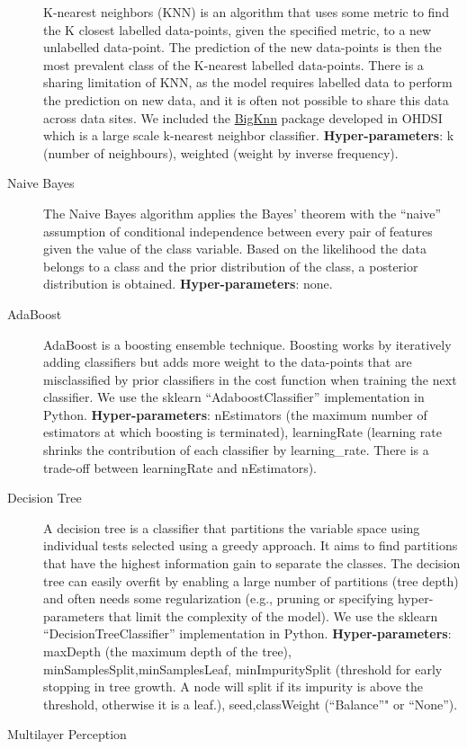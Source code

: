 \documentclass[]{book}
\begin{document}
\begin{description}
K-nearest neighbors (KNN) is an algorithm that uses some metric to find
the K closest labelled data-points, given the specified metric, to a new
unlabelled data-point. The prediction of the new data-points is then the
most prevalent class of the K-nearest labelled data-points. There is a
sharing limitation of KNN, as the model requires labelled data to
perform the prediction on new data, and it is often not possible to
share this data across data sites. We included the
\href{https://github.com/OHDSI/BigKnn}{BigKnn} package developed in
OHDSI which is a large scale k-nearest neighbor classifier.
\textbf{Hyper-parameters}: k (number of neighbours), weighted (weight by
inverse frequency).
\item[Naive Bayes]
The Naive Bayes algorithm applies the Bayes' theorem with the ``naive''
assumption of conditional independence between every pair of features
given the value of the class variable. Based on the likelihood the data
belongs to a class and the prior distribution of the class, a posterior
distribution is obtained. \textbf{Hyper-parameters}: none.
\item[AdaBoost]
AdaBoost is a boosting ensemble technique. Boosting works by iteratively
adding classifiers but adds more weight to the data-points that are
misclassified by prior classifiers in the cost function when training
the next classifier. We use the sklearn ``AdaboostClassifier''
implementation in Python. \textbf{Hyper-parameters}: nEstimators (the
maximum number of estimators at which boosting is terminated),
learningRate (learning rate shrinks the contribution of each classifier
by learning\_rate. There is a trade-off between learningRate and
nEstimators).
\item[Decision Tree]
A decision tree is a classifier that partitions the variable space using
individual tests selected using a greedy approach. It aims to find
partitions that have the highest information gain to separate the
classes. The decision tree can easily overfit by enabling a large number
of partitions (tree depth) and often needs some regularization (e.g.,
pruning or specifying hyper-parameters that limit the complexity of the
model). We use the sklearn ``DecisionTreeClassifier'' implementation in
Python. \textbf{Hyper-parameters}: maxDepth (the maximum depth of the
tree), minSamplesSplit,minSamplesLeaf, minImpuritySplit (threshold for
early stopping in tree growth. A node will split if its impurity is
above the threshold, otherwise it is a leaf.), seed,classWeight
(``Balance''" or ``None'').
\item[Multilayer Perception]

\end{description}
\end{document}
